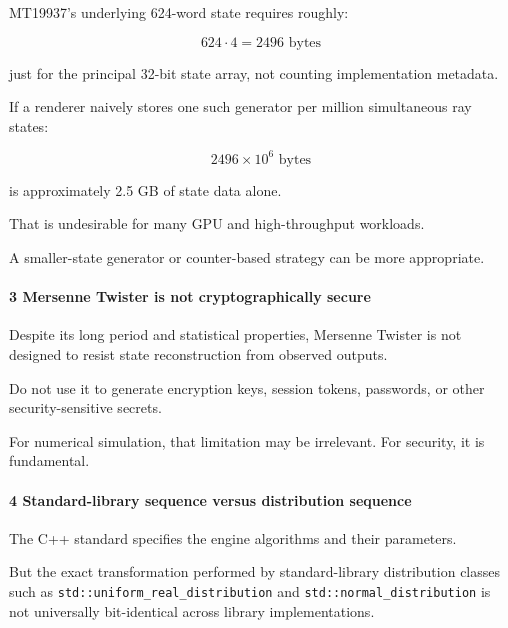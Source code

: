 \hypertarget{02-foundations-ii-ch029-the-state-footprint}{}

MT19937's underlying 624-word state requires roughly:

\[
 624\cdot4=2496\text{ bytes}
\]

just for the principal 32-bit state array, not counting implementation metadata.

If a renderer naively stores one such generator per million simultaneous ray states:

\[
 2496\times10^6\text{ bytes}
\]

is approximately 2.5 GB of state data alone.

That is undesirable for many GPU and high-throughput workloads.

A smaller-state generator or counter-based strategy can be more appropriate.

\paragraph{3 Mersenne Twister is not cryptographically secure}\label{02-foundations-ii-ch029-mersenne-twister-is-not-cryptographically-secure}

\hypertarget{02-foundations-ii-ch029-mersenne-twister-is-not-cryptographically-secure}{}

Despite its long period and statistical properties, Mersenne Twister is not designed to resist state reconstruction from observed outputs.

Do not use it to generate encryption keys, session tokens, passwords, or other security-sensitive secrets.

For numerical simulation, that limitation may be irrelevant. For security, it is fundamental.

\paragraph{4 Standard-library sequence versus distribution sequence}\label{02-foundations-ii-ch029-standard-library-sequence-versus-distribution-sequence}

\hypertarget{02-foundations-ii-ch029-standard-library-sequence-versus-distribution-sequence}{}

The C++ standard specifies the engine algorithms and their parameters.

But the exact transformation performed by standard-library distribution classes such as \texttt{std::uniform\_real\_distribution} and \texttt{std::normal\_distribution} is not universally bit-identical across library implementations.


